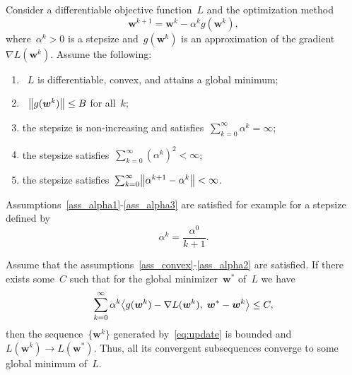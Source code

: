 Consider a differentiable objective function~$L$ and the optimization method
\begin{equation}\label{eq:update}
  \bm{w}^{k+1} = \bm{w}^k - \alpha^k g(\bm{w}^k),
\end{equation}
where~$\alpha^k > 0$ is a stepsize and~$g(\bm{w}^k)$ is an approximation of the gradient~$\nabla L(\bm{w}^k)$. Assume the following:
\begin{enumerate}[label={(\textbf{A\arabic*})}, left = 15pt]
  \item \label{ass_convex}~$L$ is differentiable, convex, and attains a global minimum;
  \item \label{ass_gbound}~$\norm{g(\bm{w}^k)} \leq B$ for all~$k$;
  \item \label{ass_alpha1} the stepsize is non-increasing and satisfies~$\sum_{k=0}^\infty \alpha^k = \infty$;
  \item \label{ass_alpha2} the stepsize satisfies~$\sum_{k=0}^\infty (\alpha^k)^2<\infty$;
  \item \label{ass_alpha3} the stepsize satisfies~$\sum_{k=0}^\infty \norm{\alpha^{k+1}-  \alpha^k}<\infty$.
\end{enumerate}
Assumptions~\ref{ass_alpha1}-\ref{ass_alpha3} are satisfied for example for a stepsize defined by
\begin{equation*}
  \alpha^k = \frac{\alpha^0}{k+1}.
\end{equation*}

\pagebreak

\begin{theorem}\label{thm:convergence}
  Assume that the assumptions~\ref{ass_convex}-\ref{ass_alpha2} are satisfied. If there exists some~$C$ such that for the global minimizer~$\bm{w}^*$ of~$L$ we have
  \begin{equation}\label{eq:nec_cond}
    \sum_{k=0}^\infty \alpha^k \inner{g(\bm{w}^k) - \nabla L(\bm{w}^k)}{\bm{w}^* - \bm{w}^k} \leq C,
  \end{equation}
  then the sequence~$\{\bm{w}^k\}$ generated by~\eqref{eq:update} is bounded and~$L(\bm{w}^k) \to L(\bm{w}^*)$. Thus, all its convergent subsequences converge to some global minimum of~$L$.
\end{theorem}

